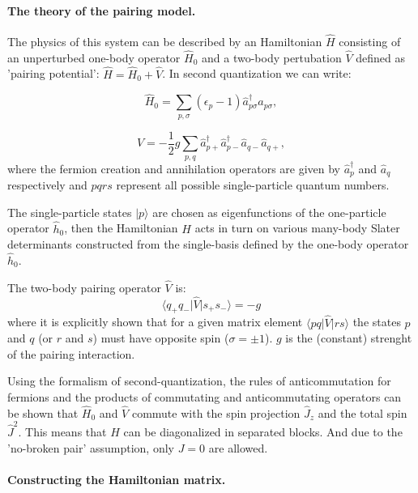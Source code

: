 \documentclass[twoside]{article}
\begin{document}

\paragraph{The theory of the pairing model.} The physics of this system can be described by an Hamiltonian $\hat H$ consisting of an unperturbed one-body operator $\hat H_0$ and a two-body pertubation $\hat V $ defined as 'pairing potential': $\hat H = \hat H_0 + \hat V$. In second quantization we can write:

\begin{equation}
\hat H_0 =  \sum_{p,\sigma} (\epsilon_p-1) \hat a_{p\sigma}^\dagger \hat a_{p\sigma},
\label{eq:H_0}
\end{equation}

\begin{equation}
\hat V = -\frac{1}{2} g \sum_{p,q} \hat a_{p+}^\dagger \hat a_{p-}^\dagger \hat a_{q-} \hat a_{q+} ,\label{eq:V}
\end{equation}
where the fermion creation and annihilation operators are given by $\hat a_{p}^\dagger$ and $\hat a_{q}$ respectively and $pqrs$ represent all possible single-particle quantum numbers.

The single-particle states $\vert p \rangle$ are chosen as eigenfunctions of the one-particle operator $\hat{h}_0$, then the Hamiltonian $H$ acts in turn on various many-body Slater determinants constructed from the single-basis defined by the one-body operator $\hat{h}_0$.

The two-body pairing operator $\hat{V}$ is:
\begin{equation}
\langle q_+ q_- \vert \hat{V} \vert s_+s_- \rangle = -g
\end{equation}
where it is explicitly shown that for a given matrix element $\langle pq \vert \hat{V} \vert rs \rangle$ the states $p$ and $q$ (or $r$ and $s$) must have opposite spin ($\sigma=\pm 1$). $g$ is the (constant) strenght of the pairing interaction.

Using the formalism of second-quantization, the rules of anticommutation for fermions and the products of commutating and anticommutating operators can be shown that $\hat{H}_0$ and $\hat{V}$ commute with the spin projection $\hat{J}_z$ and the total spin $\hat{J}^2$. This means that $H$ can be diagonalized in separated blocks. And due to the 'no-broken pair' assumption, only $J = 0$ are allowed.


\paragraph{Constructing the Hamiltonian matrix.}
\end{document}
